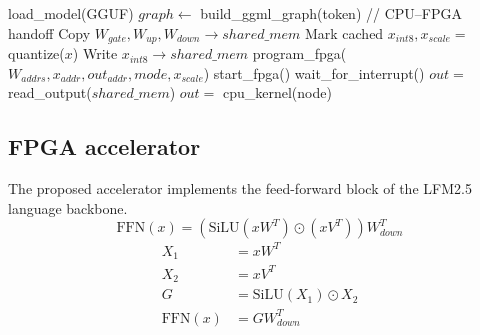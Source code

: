 \documentclass[manuscript,]{acmart} %
\begin{document}
\begin{algorithm}[htb!]
\caption{LFM2.5 Inference Execution}
\begin{algorithmic}[1]

\STATE load\_model(GGUF)
    \STATE $graph \leftarrow$ build\_ggml\_graph(token)
            \STATE // CPU--FPGA handoff
                \STATE Copy $W_{gate}, W_{up}, W_{down} \rightarrow shared\_mem$
                \STATE Mark cached
            \ENDIF
            \STATE $x_{int8}, x_{scale} =$ quantize($x$)
            \STATE Write $x_{int8} \rightarrow shared\_mem$
            \STATE program\_fpga($W_{addrs}, x_{addr}, out_{addr}, mode, x_{scale}$) 
            \STATE start\_fpga()
            \STATE wait\_for\_interrupt()
            \STATE $out =$ read\_output($shared\_mem$)
        \ELSE
            \STATE $out =$ cpu\_kernel(node)
        \ENDIF
    \ENDFOR
    \STATE {}
\ENDFOR
\end{algorithmic}
\end{algorithm}

\subsection{FPGA accelerator}
The proposed accelerator implements the feed-forward block of the LFM2.5 language backbone. 
\begin{equation}
\text{FFN}(x) = (\text{SiLU}(x W^{T}) \odot (x V^{T})) W_{down}^{T}
\label{eq:ffn}
\end{equation}
\begin{subequations}\label{eq:swiglu_stage_set}
\begin{align}
X_1 &= x W^{T} \label{eq:swiglu_s2a}\\
X_2 &= x V^{T} \label{eq:swiglu_s2b}\\
G   &= \text{SiLU}(X_1)\odot X_2 \label{eq:swiglu_s3}\\
\text{FFN}(x) &= G W_{down}^{T} \label{eq:swiglu_s4}
\end{align}
\end{subequations}
\end{document}
